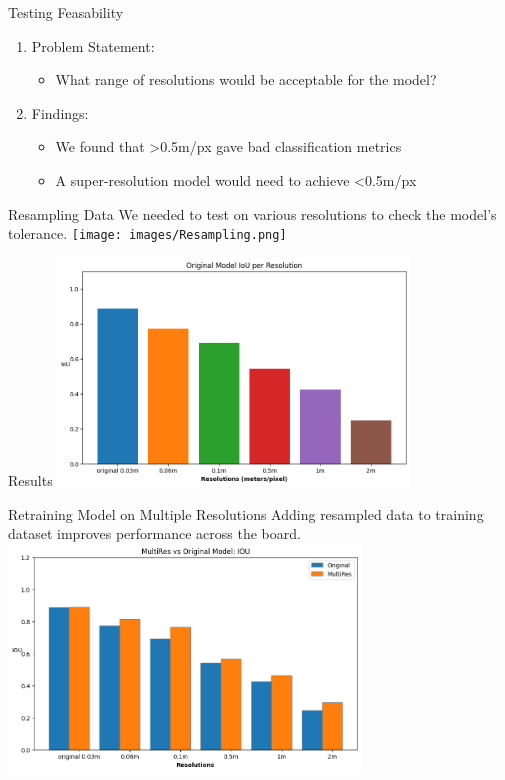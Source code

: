 \begin{frame}{Testing Feasability}
    \centering
    \begin{enumerate}
        \item Problem Statement:
            \begin{itemize}
                \item What range of resolutions would be acceptable for the model?
            \end{itemize}
        \item Findings:
            \begin{itemize}
                \item We found that >0.5m/px gave bad classification metrics
                \item A super-resolution model would need to achieve <0.5m/px
            \end{itemize}
        \end{enumerate}
\end{frame}

\begin{frame}{Resampling Data}
    \centering
    We needed to test on various resolutions to check the model's tolerance.
    \texttt{[image: images/Resampling.png]}
\end{frame}

\begin{frame}{Results}
    \centering
    \includegraphics[height=0.7\textheight,width=0.7\textwidth,keepaspectratio]{images/og_multires_iou.png}
\end{frame}

\begin{frame}{Retraining Model on Multiple Resolutions}
    Adding resampled data to training dataset improves performance across the board.
    \centering
    \includegraphics[height=0.7\textheight,width=0.7\textwidth,keepaspectratio]{images/og_vs_multires.png}
\end{frame}

